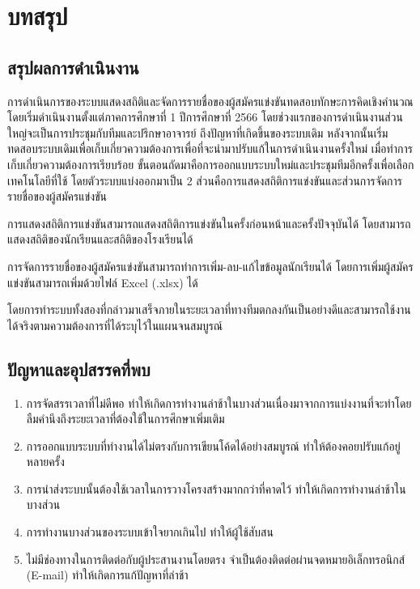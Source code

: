 \chapter{บทสรุป}
\label{chapter:conclusion}

\section{สรุปผลการดำเนินงาน}

การดำเนินการของระบบแสดงสถิติและจัดการรายชื่อของผู้สมัครแข่งขันทดสอบทักษะการคิดเชิงคำนวณ โดยเริ่มดำเนินงานตั้งแต่ภาคการศึกษาที่ 1 ปีการศึกษาที่ 2566 โดยช่วงแรกของการดำเนินงานส่วนใหญ่จะเป็นการประชุมกับทีมและปรึกษาอาจารย์ ถึงปัญหาที่เกิดขึ้นของระบบเดิม หลังจากนั้นเริ่มทดสอบระบบเดิมเพื่อเก็บเกี่ยวความต้องการเพื่อที่จะนำมาปรับแก้ในการดำเนินงานครั้งใหม่ เมื่อทำการเก็บเกี่ยวความต้องการเรียบร้อย ขั้นตอนถัดมาคือการออกแบบระบบใหม่และประชุมทีมอีกครั้งเพื่อเลือกเทคโนโลยีที่ใช้ โดยตัวระบบแบ่งออกมาเป็น 2 ส่วนคือการแสดงสถิติการแข่งขันและส่วนการจัดการรายชื่อของผู้สมัครแข่งขัน

การแสดงสถิติการแข่งขันสามารถแสดงสถิติการแข่งขันในครั้งก่อนหน้าและครั้งปัจจุบันได้ โดยสามารถแสดงสถิติของนักเรียนและสถิติของโรงเรียนได้ 

การจัดการรายชื่อของผู้สมัครแข่งขันสามารถทำการเพิ่ม-ลบ-แก้ไขข้อมูลนักเรียนได้ โดยการเพิ่มผู้สมัครแข่งขันสามารถเพิ่มด้วยไฟล์ Excel (.xlsx) ได้

โดยการทำระบบทั้งสองที่กล่าวมาเสร็จภายในระยะเวลาที่ทางทีมตกลงกันเป็นอย่างดีและสามารถใช้งานได้จริงตามความต้องการที่ได้ระบุไว้ในแผนจนสมบูรณ์

\section{ปัญหาและอุปสรรคที่พบ}

\begin{enumerate}
    \item การจัดสรรเวลาที่ไม่ดีพอ ทำให้เกิดการทำงานล่าช้าในบางส่วนเนื่องมาจากการแบ่งงานที่จะทำโดยลืมคำนึงถึงระยะเวลาที่ต้องใช้ในการศึกษาเพิ่มเติม
    \item การออกแบบระบบที่ทำงานได้ไม่ตรงกับการเขียนโค้ดได้อย่างสมบูรณ์ ทำให้ต้องคอยปรับแก้อยู่หลายครั้ง
    \item การนำส่งระบบนั้นต้องใช้เวลาในการวางโครงสร้างมากกว่าที่คาดไว้ ทำให้เกิดการทำงานล่าช้าในบางส่วน
    \item การทำงานบางส่วนของระบบเข้าใจยากเกินไป ทำให้ผู้ใช้สับสน
    \item ไม่มีช่องทางในการติดต่อกับผู้ประสานงานโดยตรง จำเป็นต้องติดต่อผ่านจดหมายอิเล็กทรอนิกส์ (E-mail) ทำให้เกิดการแก้ปัญหาที่ล่าช้า
\end{enumerate}

